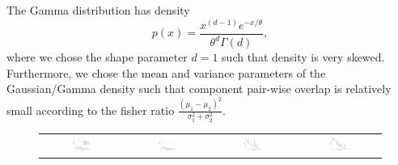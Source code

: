 \documentclass{article}
\begin{document}

The Gamma distribution has density
$$p(x)=\frac{x^{(d-1)}e^{-x/\theta}}{\theta^d \Gamma(d)},$$
where we chose the shape parameter $d=1$ such that density is very skewed. Furthermore, we chose the mean and variance parameters of the Gaussian/Gamma density such that component pair-wise overlap is relatively small according to the fisher ratio $\frac{(\mu_1 - \mu_2)^2}{\sigma_1^2+\sigma_2^2}$. 

\begin{figure}[!t]
  \hspace{-7mm}
  \renewcommand{\tabcolsep}{1pt}
  \begin{tabular}{cccc}
    \includegraphics[width=0.26\textwidth]{../experiment/figure/sp_diff_gauss_k_2_view_1-crop} &
    \includegraphics[width=0.26\textwidth]{../experiment/figure/sp_diff_gauss_k_3_view_1-crop} &
    \includegraphics[width=0.26\textwidth]{../experiment/figure/sp_diff_gauss_k_4_view_1-crop} &
    \includegraphics[width=0.26\textwidth]{../experiment/figure/sp_diff_gauss_k_8_view_1-crop} \\

\end{tabular}
\end{figure}
\end{document}
